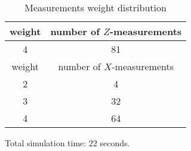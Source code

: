 \documentclass[12pt]{article}
\begin{document}
\begin{table}[h]
\centering
\begin{tabular}{c c}
\hline
weight & number of $Z$-measurements\\
\hline
4 & 81\\
\hline
\hline
weight & number of $X$-measurements\\
\hline
2 & 4\\
3 & 32\\
4 & 64\\
\hline
\end{tabular}
\caption{Measurements weight distribution}
\end{table}
\vspace{.3cm}



\vspace{2cm}
Total simulation time: $22$ seconds.
\end{document}
